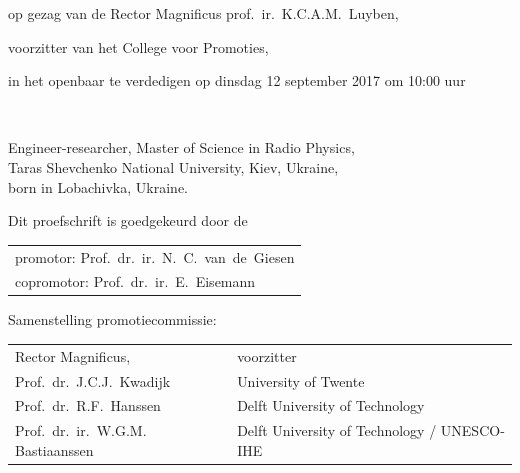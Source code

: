 \begin{titlepage}
\begin{center}
op gezag van de Rector Magnificus prof.~ir.~K.C.A.M.~Luyben,

voorzitter van het College voor Promoties,

in het openbaar te verdedigen op dinsdag 12 september 2017 om 10:00 uur

\bigskip
\bigskip


\bigskip
\bigskip

\makeatletter
{\Large\titlefont\bfseries\@firstname\ {\titleshape\@lastname}}
\makeatother

\bigskip
\bigskip

Engineer-researcher, Master of Science in Radio Physics, \\
Taras Shevchenko National University, Kiev, Ukraine, \\
born in Lobachivka, Ukraine.

\vspace*{2\bigskipamount}

\end{center}

\clearpage
\thispagestyle{empty}

\noindent Dit proefschrift is goedgekeurd door de

\medskip\noindent
\begin{tabular}{l}
    promotor: Prof.\ dr.\ ir.\ N.\ C.\ van\ de\ Giesen \\
    copromotor: Prof.\ dr.\ ir.\ E.\ Eisemann
\end{tabular}

\bigskip
\noindent Samenstelling promotiecommissie:

\medskip\noindent
\begin{tabular}{p{5cm}l}
    Rector Magnificus, & voorzitter \\

	Prof.\ dr.\ J.C.J.\ Kwadijk & University of Twente \\

    Prof.\ dr.\ R.F.\ Hanssen & Delft University of Technology \\
    
	Prof.\ dr.\ ir.\ W.G.M. Bastiaanssen & Delft University of Technology / UNESCO-IHE \\


\end{tabular}
\end{titlepage}
